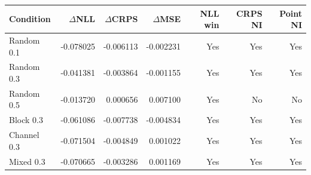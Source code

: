\begin{tabular}{@{}lrrrrrr@{}}
\toprule
Condition & $\Delta$NLL & $\Delta$CRPS & $\Delta$MSE & NLL win & CRPS NI & Point NI \\
\midrule
Random 0.1 & -0.078025 & -0.006113 & -0.002231 & Yes & Yes & Yes \\
Random 0.3 & -0.041381 & -0.003864 & -0.001155 & Yes & Yes & Yes \\
Random 0.5 & -0.013720 & 0.000656 & 0.007100 & Yes & No & No \\
Block 0.3 & -0.061086 & -0.007738 & -0.004834 & Yes & Yes & Yes \\
Channel 0.3 & -0.071504 & -0.004849 & 0.001022 & Yes & Yes & Yes \\
Mixed 0.3 & -0.070665 & -0.003286 & 0.001169 & Yes & Yes & Yes \\
\bottomrule
\end{tabular}
